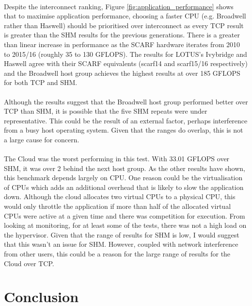 \documentclass{article}
\begin{document}
        \paragraph{}
        Despite the interconnect ranking, Figure \ref{fig:application_performance} shows that to maximise application performance, choosing a faster CPU (e.g. Broadwell rather than Haswell) should be prioritised over interconnect as every TCP result is greater than the SHM results for the previous generations. There is a greater than linear increase in performance as the SCARF hardware iterates from 2010 to 2015/16 (roughly 35 to 130 GFLOPS). The results for LOTUS's Ivybridge and Haswell agree with their SCARF equivalents (scarf14 and scarf15/16 respectively) and the Broadwell host group achieves the highest results at over 185 GFLOPS for both TCP and SHM.

        \paragraph{}
        Although the results suggest that the Broadwell host group performed better over TCP than SHM, it is possible that the five SHM repeats were under representative. This could be the result of an external factor, perhaps interference from a busy host operating system. Given that the ranges do overlap, this is not a large cause for concern.

        \paragraph{}
        The Cloud was the worst performing in this test. With 33.01 GFLOPS over SHM, it was over 2 behind the next host group. As the other results have shown, this benchmark depends largely on CPU. One reason could be the virtualisation of CPUs which adds an additional overhead that is likely to slow the application down. Although the cloud allocates two virtual CPUs to a physical CPU, this would only throttle the application if more than half of the allocated virtual CPUs were active at a given time and there was competition for execution. From looking at monitoring, for at least some of the tests, there was not a high load on the hypervisor. Given that the range of results for SHM is low, I would suggest that this wasn't an issue for SHM. However, coupled with network interference from other users, this could be a reason for the large range of results for the Cloud over TCP.

\section{Conclusion}
\end{document}
